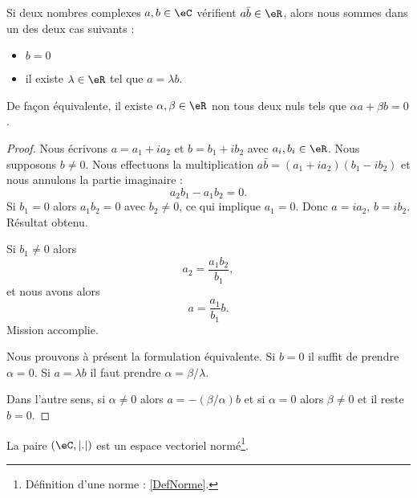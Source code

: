 \begin{lemma}       \label{LEMooXJBJooFDmhnV}
	Si deux nombres complexes \( a,b\in \eC\) vérifient \( a\bar b\in \eR\), alors nous sommes dans un des deux cas suivants :
	\begin{itemize}
		\item \( b=0\)
		\item il existe \( \lambda\in \eR\) tel que \( a=\lambda b\).
	\end{itemize}
	De façon équivalente, il existe \( \alpha,\beta\in \eR\) non tous deux nuls tels que \( \alpha a+\beta b=0\).
\end{lemma}

\begin{proof}
	Nous écrivons \( a=a_1+ia_2\) et \( b=b_1+ib_2\) avec \( a_i,b_i\in \eR\). Nous supposons \( b\neq 0\). Nous effectuons la multiplication \( a\bar b=(a_1+ia_2)(b_1-ib_2)\) et nous annulons la partie imaginaire :
	\begin{equation}
		a_2b_1-a_1b_2=0.
	\end{equation}
	Si \( b_1=0\) alors \( a_1b_2=0\) avec \( b_2\neq 0\), ce qui implique \( a_1=0\). Donc \( a=ia_2\), \( b=ib_2\). Résultat obtenu.

	Si \( b_1\neq 0\) alors
	\begin{equation}
		a_2=\frac{ a_1b_2 }{ b_1 },
	\end{equation}
	et nous avons alors
	\begin{equation}
		a=\frac{ a_1 }{ b_1 }b.
	\end{equation}
	Mission accomplie.

	Nous prouvons à présent la formulation équivalente. Si \( b=0\) il suffit de prendre \( \alpha=0\). Si \( a=\lambda b\) il faut prendre \( \alpha=\beta/\lambda\).

	Dans l'autre sens, si \( \alpha\neq 0\) alors \( a=-(\beta/\alpha)b\) et si \( \alpha=0\) alors \( \beta\neq 0\) et il reste \( b=0\).
\end{proof}

\begin{proposition}     \label{PROPooZJAXooYwSSvo}
	La paire \( (\eC, | . |)\) est un espace vectoriel normé\footnote{Définition d'une norme : \ref{DefNorme}.}.
\end{proposition}

